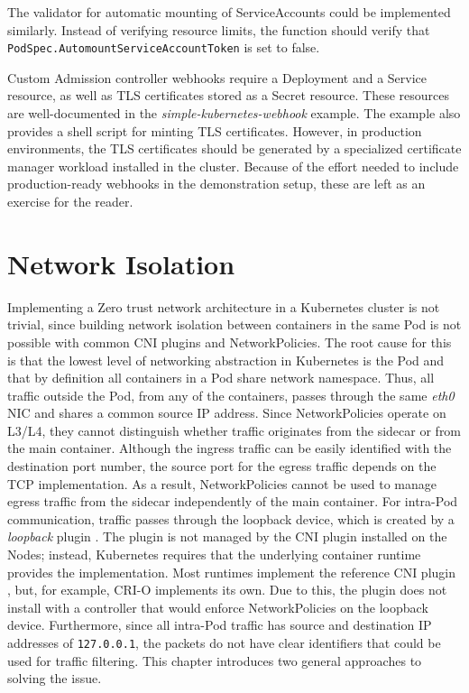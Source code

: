 \documentclass[english, 12pt, a4paper, sci, utf8, a-2b, online]{aaltothesis}
\begin{document}


The validator for automatic mounting of ServiceAccounts could be implemented similarly.
Instead of verifying resource limits, the function should verify that \lstinline{PodSpec.AutomountServiceAccountToken} is set to false.

Custom Admission controller webhooks require a Deployment and a Service resource, as well as TLS certificates stored as a Secret resource.
These resources are well-documented in the \emph{simple-kubernetes-webhook} example.
The example also provides a shell script for minting TLS certificates.
However, in production environments, the TLS certificates should be generated by a specialized certificate manager workload installed in the cluster.
Because of the effort needed to include production-ready webhooks in the demonstration setup, these are left as an exercise for the reader.

\clearpage

\section{Network Isolation} \label{sec:network-solution}

Implementing a Zero trust network architecture in a Kubernetes cluster is not trivial, since building network isolation between containers in the same Pod is not possible with common CNI plugins and NetworkPolicies.
The root cause for this is that the lowest level of networking abstraction in Kubernetes is the Pod and that by definition all containers in a Pod share network namespace.
Thus, all traffic outside the Pod, from any of the containers, passes through the same \emph{eth0} NIC and shares a common source IP address.
Since NetworkPolicies operate on L3/L4, they cannot distinguish whether traffic originates from the sidecar or from the main container.
Although the ingress traffic can be easily identified with the destination port number, the source port for the egress traffic depends on the TCP implementation.
As a result, NetworkPolicies cannot be used to manage egress traffic from the sidecar independently of the main container.
For intra-Pod communication, traffic passes through the loopback device, which is created by a \emph{loopback} plugin \cite{k8s-docs-cni}.
The plugin is not managed by the CNI plugin installed on the Nodes; instead, Kubernetes requires that the underlying container runtime provides the implementation.
Most runtimes implement the reference CNI plugin \cite{cni-loopback}, but, for example, CRI-O implements its own.
Due to this, the plugin does not install with a controller that would enforce NetworkPolicies on the loopback device.
Furthermore, since all intra-Pod traffic has source and destination IP addresses of \lstinline{127.0.0.1}, the packets do not have clear identifiers that could be used for traffic filtering.
This chapter introduces two general approaches to solving the issue.
\end{document}
